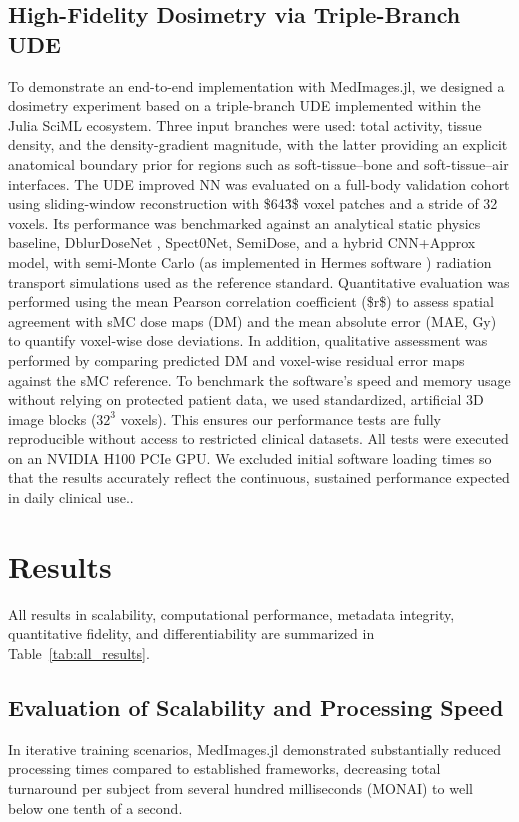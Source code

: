 \documentclass[a4paper,10pt,preprint]{elsarticle}
\begin{document}
\subsection{High-Fidelity Dosimetry via Triple-Branch UDE}
To demonstrate an end-to-end implementation with MedImages.jl, we designed a dosimetry experiment based on a triple-branch UDE implemented within the Julia SciML ecosystem. Three input branches were used: total activity, tissue density, and the density-gradient magnitude, with the latter providing an explicit anatomical boundary prior for regions such as soft-tissue--bone and soft-tissue--air interfaces. 
The UDE improved NN was evaluated on a full-body validation cohort using sliding-window reconstruction with \$64\^3\$ voxel patches and a stride of 32 voxels. Its performance was benchmarked against an analytical static physics baseline, DblurDoseNet \cite{LiFessler2021}, Spect0Net, SemiDose, and a hybrid CNN+Approx model, with semi-Monte Carlo (as implemented in Hermes software  \cite{Hermes_1,Hermes_2} ) radiation transport simulations used as the reference standard. Quantitative evaluation was performed using the mean Pearson correlation coefficient (\$r\$) to assess spatial agreement with sMC dose maps (DM) and the mean absolute error (MAE, Gy) to quantify voxel-wise dose deviations. In addition, qualitative assessment was performed by comparing predicted DM and voxel-wise residual error maps against the sMC reference.
To benchmark the software's speed and memory usage without relying on protected patient data, we used standardized, artificial 3D image blocks (\(32^3\) voxels). This ensures our performance tests are fully reproducible without access to restricted clinical datasets. All tests were executed on an NVIDIA H100 PCIe GPU. We excluded initial software loading times so that the results accurately reflect the continuous, sustained performance expected in daily clinical use..
 

\section{Results }
All results in scalability, computational performance, metadata integrity, quantitative fidelity, and differentiability are summarized in Table~\ref{tab:all_results}.

\subsection*{Evaluation of Scalability and Processing Speed}
In iterative training scenarios, MedImages.jl demonstrated substantially reduced processing times compared to established frameworks, decreasing total turnaround per subject from several hundred milliseconds (MONAI) to well below one tenth of a second. 
\end{document}
